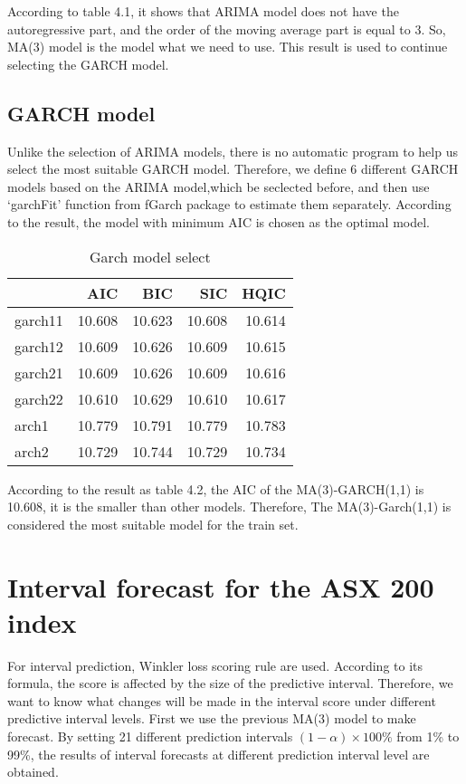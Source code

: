 \documentclass{monashthesis}
\theoremstyle{definition}
\theoremstyle{definition}
\theoremstyle{definition}
\theoremstyle{remark}
\begin{document}
According to table 4.1, it shows that ARIMA model does not have the
autoregressive part, and the order of the moving average part is equal
to 3. So, MA(3) model is the model what we need to use. This result is
used to continue selecting the GARCH model.

\subsection{GARCH model}\label{garch-model}

Unlike the selection of ARIMA models, there is no automatic program to
help us select the most suitable GARCH model. Therefore, we define 6
different GARCH models based on the ARIMA model,which be seclected
before, and then use `garchFit' function from fGarch package to estimate
them separately. According to the result, the model with minimum AIC is
chosen as the optimal model.

\begin{table}

\caption{\label{tab:table1}Garch model select}
\centering
\begin{tabular}[t]{lrrrr}
\toprule
  & AIC & BIC & SIC & HQIC\\
\midrule
garch11 & 10.608 & 10.623 & 10.608 & 10.614\\
garch12 & 10.609 & 10.626 & 10.609 & 10.615\\
garch21 & 10.609 & 10.626 & 10.609 & 10.616\\
garch22 & 10.610 & 10.629 & 10.610 & 10.617\\
arch1 & 10.779 & 10.791 & 10.779 & 10.783\\
arch2 & 10.729 & 10.744 & 10.729 & 10.734\\
\bottomrule
\end{tabular}
\end{table}

According to the result as table 4.2, the AIC of the MA(3)-GARCH(1,1) is
10.608, it is the smaller than other models. Therefore, The
MA(3)-Garch(1,1) is considered the most suitable model for the train
set.

\section{Interval forecast for the ASX 200
index}\label{interval-forecast-for-the-asx-200-index}

For interval prediction, Winkler loss scoring rule are used. According
to its formula, the score is affected by the size of the predictive
interval. Therefore, we want to know what changes will be made in the
interval score under different predictive interval levels. First we use
the previous MA(3) model to make forecast. By setting 21 different
prediction intervals \((1-\alpha)\times100\%\) from 1\% to 99\%, the
results of interval forecasts at different prediction interval level are
obtained.
\end{document}
